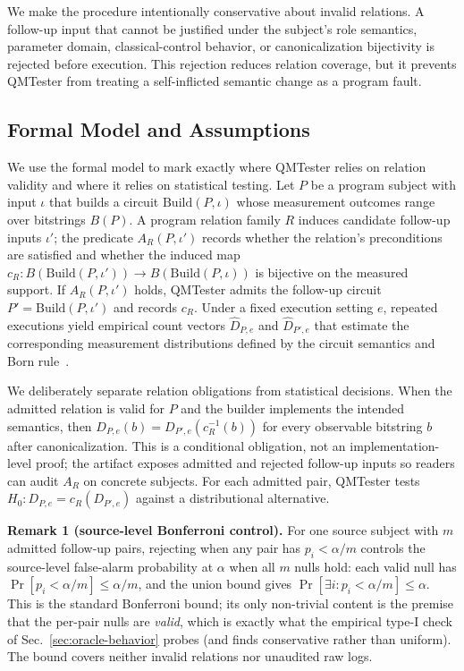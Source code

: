We make the procedure intentionally conservative about invalid relations. A follow-up input that cannot be justified under the subject's role semantics, parameter domain, classical-control behavior, or canonicalization bijectivity is rejected before execution. This rejection reduces relation coverage, but it prevents QMTester from treating a self-inflicted semantic change as a program fault.

\subsection{Formal Model and Assumptions}

We use the formal model to mark exactly where QMTester relies on relation validity and where it relies on statistical testing. Let $P$ be a program subject with input $\iota$ that builds a circuit $\mathrm{Build}(P,\iota)$ whose measurement outcomes range over bitstrings $B(P)$. A program relation family $R$ induces candidate follow-up inputs $\iota'$; the predicate $A_R(P,\iota')$ records whether the relation's preconditions are satisfied and whether the induced map $c_R:B(\mathrm{Build}(P,\iota'))\rightarrow B(\mathrm{Build}(P,\iota))$ is bijective on the measured support. If $A_R(P,\iota')$ holds, QMTester admits the follow-up circuit $P'=\mathrm{Build}(P,\iota')$ and records $c_R$. Under a fixed execution setting $e$, repeated executions yield empirical count vectors $\hat{D}_{P,e}$ and $\hat{D}_{P',e}$ that estimate the corresponding measurement distributions defined by the circuit semantics and Born rule~\cite{nielsen2010quantum}.

We deliberately separate relation obligations from statistical decisions. When the admitted relation is valid for $P$ and the builder implements the intended semantics, then $D_{P,e}(b)=D_{P',e}(c_R^{-1}(b))$ for every observable bitstring $b$ after canonicalization. This is a conditional obligation, not an implementation-level proof; the artifact exposes admitted and rejected follow-up inputs so readers can audit $A_R$ on concrete subjects. For each admitted pair, QMTester tests $H_0:D_{P,e}=c_R(D_{P',e})$ against a distributional alternative.

\noindent\textbf{Remark 1 (source-level Bonferroni control).} For one source subject with $m$ admitted follow-up pairs, rejecting when any pair has $p_i<\alpha/m$ controls the source-level false-alarm probability at $\alpha$ when all $m$ nulls hold: each valid null has $\Pr[p_i<\alpha/m]\leq\alpha/m$, and the union bound gives $\Pr[\exists i:p_i<\alpha/m]\leq\alpha$. This is the standard Bonferroni bound; its only non-trivial content is the premise that the per-pair nulls are \emph{valid}, which is exactly what the empirical type-I check of Sec.~\ref{sec:oracle-behavior} probes (and finds conservative rather than uniform). The bound covers neither invalid relations nor unaudited raw logs.

